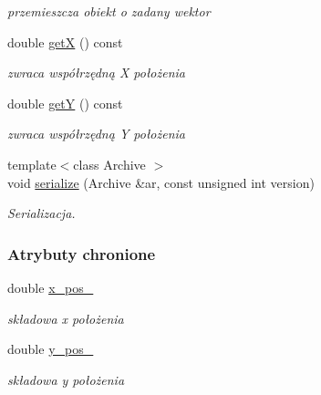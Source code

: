 \begin{DoxyCompactItemize}
\begin{DoxyCompactList}\small\item\em przemieszcza obiekt o zadany wektor \end{DoxyCompactList}\item 
\hypertarget{classcommon_1_1MapObject_aa9e8a4c9ecbb9ee68344af018dcd7f1d}{double \hyperlink{classcommon_1_1MapObject_aa9e8a4c9ecbb9ee68344af018dcd7f1d}{get\-X} () const }\label{classcommon_1_1MapObject_aa9e8a4c9ecbb9ee68344af018dcd7f1d}

\begin{DoxyCompactList}\small\item\em zwraca współrzędną X położenia \end{DoxyCompactList}\item 
\hypertarget{classcommon_1_1MapObject_a34d9d7d94ef963954bc276de4fc7d19c}{double \hyperlink{classcommon_1_1MapObject_a34d9d7d94ef963954bc276de4fc7d19c}{get\-Y} () const }\label{classcommon_1_1MapObject_a34d9d7d94ef963954bc276de4fc7d19c}

\begin{DoxyCompactList}\small\item\em zwraca współrzędną Y położenia \end{DoxyCompactList}\item 
{\footnotesize template$<$class Archive $>$ }\\void \hyperlink{classcommon_1_1MapObject_ac9f0fecb3c62b2fae69bbad56eb18944}{serialize} (Archive \&ar, const unsigned int version)
\begin{DoxyCompactList}\small\item\em Serializacja. \end{DoxyCompactList}\end{DoxyCompactItemize}
\subsubsection*{Atrybuty chronione}
\begin{DoxyCompactItemize}
\item 
\hypertarget{classcommon_1_1MapObject_a453b223be3378af582d03003153d4254}{double \hyperlink{classcommon_1_1MapObject_a453b223be3378af582d03003153d4254}{x\-\_\-pos\-\_\-}}\label{classcommon_1_1MapObject_a453b223be3378af582d03003153d4254}

\begin{DoxyCompactList}\small\item\em składowa x położenia \end{DoxyCompactList}\item 
\hypertarget{classcommon_1_1MapObject_acb4cfa86774eb5319447d6bfe143006a}{double \hyperlink{classcommon_1_1MapObject_acb4cfa86774eb5319447d6bfe143006a}{y\-\_\-pos\-\_\-}}\label{classcommon_1_1MapObject_acb4cfa86774eb5319447d6bfe143006a}

\begin{DoxyCompactList}\small\item\em składowa y położenia \end{DoxyCompactList}\end{DoxyCompactItemize}


